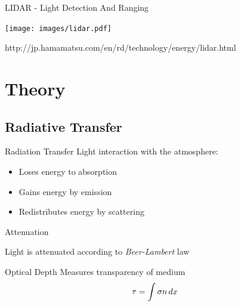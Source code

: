 \documentclass[compress,red,12pt]{beamer}
\begin{document}

\begin{frame}{LIDAR - Light Detection And Ranging}
  \begin{center}
    \texttt{[image: images/lidar.pdf]}
  \end{center}

  \begin{flushright}
    {\tiny http://jp.hamamatsu.com/en/rd/technology/energy/lidar.html}
  \end{flushright}
  {
  }
\end{frame}


\section{Theory}


\subsection{Radiative Transfer}

\begin{frame}{Radiation Transfer}
  Light interaction with the atmosphere:
  \begin{itemize}
  \item Loses energy to absorption
  \item Gains energy by emission
  \item Redistributes energy by scattering
  \end{itemize}
\end{frame}


% 
\begin{frame}{Attenuation}
  \begin{block}{Light is attenuated according to {\em Beer-Lambert} law}
    \centerline{\def\svgwidth{0.6\columnwidth}\small{}}
  \end{block}
  {
    \begin{block}{Optical Depth}    
      Measures transparency of medium
      \begin{align*}
        \tau = \int \sigma n \,d{x}
      \end{align*}
    \end{block}
  }
\end{frame}
\end{document}
